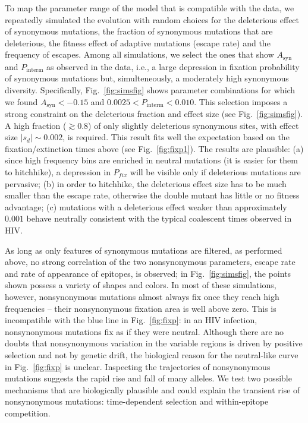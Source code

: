\documentclass[rmp, twocolumn]{revtex4}
\newcommand{\pfix}{P_{fix}}
\newcommand{\FIG}[1]{Fig.~\ref{fig:#1}}
\begin{document}
To map the parameter range of the model that is compatible with the data, we
repeatedly simulated the evolution with random choices for the deleterious
effect of synonymous mutations, the fraction of synonymous mutations that are
deleterious, the fitness effect of adaptive mutations (escape rate) and the frequency of
escapes. Among all simulations, we select the ones that show $A_\text{syn}$ and
$P_\text{interm}$ as observed in the data, i.e., a large depression in fixation
probability of synonymous mutations but, simulteneously, a moderately high
synonymous diversity. Specifically, \FIG{simsfig} shows parameter combinations
for which we found $A_\text{syn} < -0.15$ and $0.0025 < P_\text{interm} <
0.010$. This selection imposes a strong
constraint on the deleterious fraction and effect size (see \FIG{simsfig}).
A high fraction ($\gtrsim 0.8$) of only slightly deleterious synonymous sites,
with effect size $|s_d| \sim 0.002$, is required. This result fits well the
expectation based on the fixation/extinction times above (see \FIG{fixp1}).
The results are plausible:
(a) since high frequency bins are enriched in neutral mutations (it is easier
for them to hitchhike), a depression in $\pfix$ will be
visible only if deleterious mutations are pervasive; (b) in order to
hitchhike, the deleterious effect size has to be much smaller than the escape
rate, otherwise the
double mutant has little or no fitness advantage; (c) mutations with a 
deleterious effect weaker than approximately $0.001$ behave neutrally
consistent with the typical coalescent times observed in HIV.

As long as only features of synonymous mutations are filtered, as performed
above, no strong correlation of the two nonsynonymous parameters, escape rate
and rate of appearance of epitopes, is observed; in \FIG{simsfig}, the points
shown possess a variety of shapes and colors. In most of these simulations, 
however, nonsynonymous mutations almost always fix once they reach high frequencies
-- their nonsynonymous fixation area is well above zero. This is incompatible
with the blue line in \FIG{fixp}: in an HIV infection, nonsynonymous mutations fix as if they
were neutral. Although there are no doubts that nonsynonymous variation in the
variable regions is driven by positive selection and not by genetic drift, the
biological reason for the neutral-like curve in \FIG{fixp} is unclear.
Inspecting the trajectories of nonsynonymous mutations
suggests the rapid rise and fall of many alleles. We test two possible
mechanisms that are biologically plausible and could explain the transient rise
of nonsynonymous mutations: time-dependent selection and within-epitope
competition.
\end{document}
